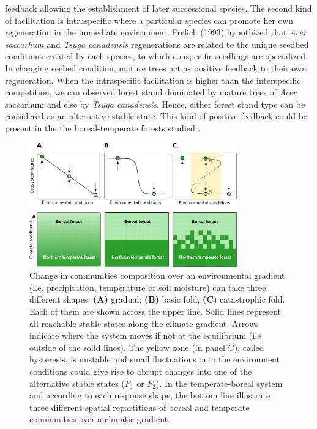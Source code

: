 feedback allowing the establishment of later successional species.  The second
kind of facilitation is intraspecific where a particular species can promote
her own regeneration in the immediate environment. Frelich (1993)
\cite{Society2014} hypothized that \textit{Acer saccarhum} and \textit{Tsuga
canadensis} regenerations are related to the unique seedbed conditions created
by each species, to which conspecific seedlings are specialized. In changing
seebed condition, mature trees act as positive feedback to their own
regeneration. When the intraspecific facilitation is higher than the
interspecific competition, we can observed forest stand dominated by mature
trees of \textit{Acer }saccarhum and else by \textit{Tsuga canadensis}.
Hence, either forest stand type can be considered as an alternative stable
state. This kind of positive feedback could be present in the the boreal-temperate  
forests studied  \cite{Barras1998,Society2014}. \\


\begin{figure}[t]
	\begin{center}
	\includegraphics[width=0.8\textwidth]{fig/states.pdf}
	\end{center}
	\caption{Change in communities composition over an environmental gradient (i.e. precipitation, temperature or soil moisture) can take three different shapes: \textbf{(A)} gradual, \textbf{(B)} basic fold,
	\textbf{(C}) catastrophic fold. Each of them are shown across the upper
	line. Solid lines represent all reachable stable states along the climate gradient.  Arrows indicate
	where the system moves if not at the equilibrium (i.e outside of the solid lines). The yellow zone (in panel C),
	called hysteresis, is unstable and small fluctuations onto the environment
	conditions could give rise to abrupt changes into one of the alternative
	stable states ($F_1$ or $F_2$). In the temperate-boreal system and according to each response shape, the bottom line illustrate three different spatial repartitions of boreal and temperate communities over a climatic gradient.}
	\label{fig1}
	\vspace{-1em}
\end{figure}


